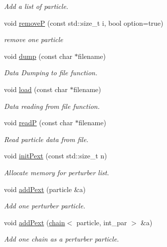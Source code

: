 \begin{DoxyCompactItemize}
\begin{DoxyCompactList}\small\item\em Add a list of particle. \end{DoxyCompactList}\item 
void \hyperlink{classARC_1_1chain_a450a7459b076331b6aaa888d209e888c}{removeP} (const std\+::size\+\_\+t i, bool option=true)
\begin{DoxyCompactList}\small\item\em remove one particle \end{DoxyCompactList}\item 
void \hyperlink{classARC_1_1chain_a6b7202e64c0a4f5d4f3f8a31f9d27e20}{dump} (const char $\ast$filename)
\begin{DoxyCompactList}\small\item\em Data Dumping to file function. \end{DoxyCompactList}\item 
void \hyperlink{classARC_1_1chain_a921a250cfcfe7a5b8e597ddcb03730ec}{load} (const char $\ast$filename)
\begin{DoxyCompactList}\small\item\em Data reading from file function. \end{DoxyCompactList}\item 
void \hyperlink{classARC_1_1chain_ae14cbd0c85aa090d0848538c6eae0afd}{readP} (const char $\ast$filename)
\begin{DoxyCompactList}\small\item\em Read particle data from file. \end{DoxyCompactList}\item 
void \hyperlink{classARC_1_1chain_a1c6de84a911feff1425dfb59e7a89087}{init\+Pext} (const std\+::size\+\_\+t n)
\begin{DoxyCompactList}\small\item\em Allocate memory for perturber list. \end{DoxyCompactList}\item 
void \hyperlink{classARC_1_1chain_ab6892980b326bd0bbe8a873a71892801}{add\+Pext} (particle \&a)
\begin{DoxyCompactList}\small\item\em Add one perturber particle. \end{DoxyCompactList}\item 
void \hyperlink{classARC_1_1chain_a964e4afb654f3d380969aa2326a287cc}{add\+Pext} (\hyperlink{classARC_1_1chain}{chain}$<$ particle, int\+\_\+par $>$ \&a)
\begin{DoxyCompactList}\small\item\em Add one chain as a perturber particle. \end{DoxyCompactList}\item 

\end{DoxyCompactItemize}
